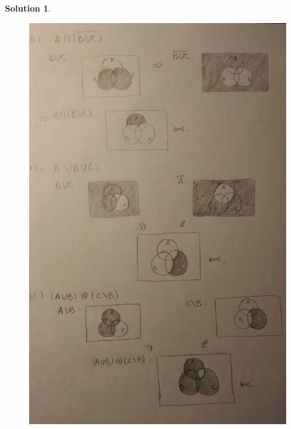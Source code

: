 \documentclass{article}
\theoremstyle{definition}
\newtheorem*{solution}{Solution}
\begin{document}
\begin{solution}
\begin{figure}
\centering
\includegraphics[width=1.1\textwidth] {Q4.jpeg}
\end{figure}
\end{solution}
\end{document}
